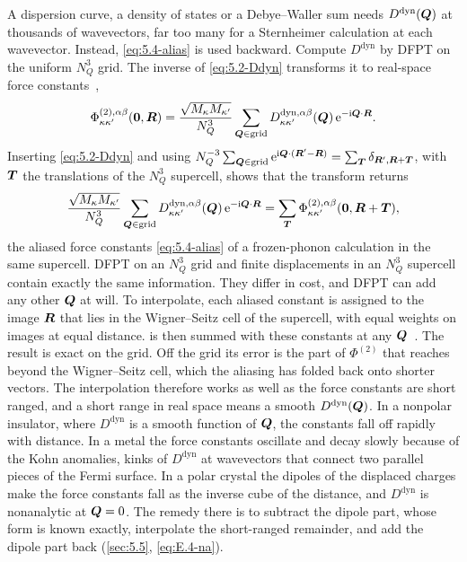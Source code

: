 A dispersion curve, a density of states or a Debye--Waller sum needs $D^{\mathrm{dyn}}(\bm{Q})$ at thousands of wavevectors, far too many for a Sternheimer calculation at each wavevector. Instead, \cref{eq:5.4-alias} is used backward. Compute $D^{\mathrm{dyn}}$ by DFPT on the uniform $N_Q^3$ grid. The inverse of \cref{eq:5.2-Ddyn} transforms it to real-space force constants~\cite[Eq.~(99)]{baroni2001phonons},
\begin{equation}
  \Phi^{(2),\alpha\beta}_{\kappa\kappa'}(\bm{0},\bm{R}) = \frac{\sqrt{M_\kappa M_{\kappa'}}}{N_Q^3}\sum_{\bm{Q}\in\mathrm{grid}} D^{\mathrm{dyn},\alpha\beta}_{\kappa\kappa'}(\bm{Q})\,\mathrm{e}^{-\mathrm{i}\bm{Q}\cdot\bm{R}} .
  \label{eq:E.4-ifc}
\end{equation}
Inserting \cref{eq:5.2-Ddyn} and using $N_Q^{-3}\sum_{\bm{Q}\in\mathrm{grid}}\mathrm{e}^{\mathrm{i}\bm{Q}\cdot(\bm{R}'-\bm{R})} = \sum_{\bm{T}}\delta_{\bm{R}',\bm{R}+\bm{T}}$, with $\bm{T}$ the translations of the $N_Q^3$ supercell, shows that the transform returns
\begin{equation*}
  \frac{\sqrt{M_\kappa M_{\kappa'}}}{N_Q^3}\sum_{\bm{Q}\in\mathrm{grid}}D^{\mathrm{dyn},\alpha\beta}_{\kappa\kappa'}(\bm{Q})\,\mathrm{e}^{-\mathrm{i}\bm{Q}\cdot\bm{R}}
  = \sum_{\bm{T}}\Phi^{(2),\alpha\beta}_{\kappa\kappa'}(\bm{0},\bm{R}+\bm{T}) ,
\end{equation*}
the aliased force constants \cref{eq:5.4-alias} of a frozen-phonon calculation in the same supercell. DFPT on an $N_Q^3$ grid and finite displacements in an $N_Q^3$ supercell contain exactly the same information. They differ in cost, and DFPT can add any other $\bm{Q}$ at will. To interpolate, each aliased constant is assigned to the image $\bm{R}$ that lies in the Wigner--Seitz cell of the supercell, with equal weights on images at equal distance.  is then summed with these constants at any $\bm{Q}$~\cite[Sect.~II.D.3]{baroni2001phonons}. The result is exact on the grid. Off the grid its error is the part of $\Phi^{(2)}$ that reaches beyond the Wigner--Seitz cell, which the aliasing has folded back onto shorter vectors. The interpolation therefore works as well as the force constants are short ranged, and a short range in real space means a smooth $D^{\mathrm{dyn}}(\bm{Q})$. In a nonpolar insulator, where $D^{\mathrm{dyn}}$ is a smooth function of $\bm{Q}$, the constants fall off rapidly with distance. In a metal the force constants oscillate and decay slowly because of the Kohn anomalies, kinks of $D^{\mathrm{dyn}}$ at wavevectors that connect two parallel pieces of the Fermi surface. In a polar crystal the dipoles of the displaced charges make the force constants fall as the inverse cube of the distance, and $D^{\mathrm{dyn}}$ is nonanalytic at $\bm{Q} = 0$. The remedy there is to subtract the dipole part, whose form is known exactly, interpolate the short-ranged remainder, and add the dipole part back (\cref{sec:5.5}, \cref{eq:E.4-na}).

